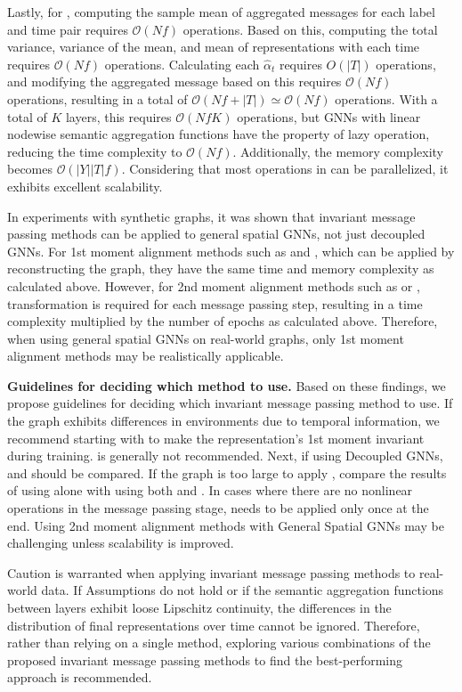 Lastly, for \JJnorm, computing the sample mean of aggregated messages for each label and time pair requires $\mathcal{O}(Nf)$ operations. Based on this, computing the total variance, variance of the mean, and mean of representations with each time requires $\mathcal{O}(Nf)$ operations. Calculating each $\hat\alpha_t$ requires $O(|T|)$ operations, and modifying the aggregated message based on this requires $\mathcal{O}(Nf)$ operations, resulting in a total of $\mathcal{O}(Nf+|T|) \simeq \mathcal{O}(Nf)$ operations. With a total of $K$ layers, this requires $\mathcal{O}(NfK)$ operations, but GNNs with linear nodewise semantic aggregation functions have the property of lazy operation, reducing the time complexity to $\mathcal{O}(Nf)$. Additionally, the memory complexity becomes $\mathcal{O}(|Y||T|f)$. Considering that most operations in \JJnorm can be parallelized, it exhibits excellent scalability.

In experiments with synthetic graphs, it was shown that invariant message passing methods can be applied to general spatial GNNs, not just decoupled GNNs. For 1st moment alignment methods such as \PMP and \MMP, which can be applied by reconstructing the graph, they have the same time and memory complexity as calculated above. However, for 2nd moment alignment methods such as \JJnorm or \PNY, transformation is required for each message passing step, resulting in a time complexity multiplied by the number of epochs as calculated above. Therefore, when using general spatial GNNs on real-world graphs, only 1st moment alignment methods may be realistically applicable.

\textbf{Guidelines for deciding which \IMPaCT method to use.} Based on these findings, we propose guidelines for deciding which invariant message passing method to use. If the graph exhibits differences in environments due to temporal information, we recommend starting with \PMP to make the representation's 1st moment invariant during training. \MMP is generally not recommended. Next, if using Decoupled GNNs, \PNY and \JJnorm should be compared. If the graph is too large to apply \PNY, compare the results of using \PMP alone with using both \PMP and \JJnorm. In cases where there are no nonlinear operations in the message passing stage, \JJnorm needs to be applied only once at the end. Using 2nd moment alignment methods with General Spatial GNNs may be challenging unless scalability is improved.

Caution is warranted when applying invariant message passing methods to real-world data. If Assumptions do not hold or if the semantic aggregation functions between layers exhibit loose Lipschitz continuity, the differences in the distribution of final representations over time cannot be ignored. Therefore, rather than relying on a single method, exploring various combinations of the proposed invariant message passing methods to find the best-performing approach is recommended.


